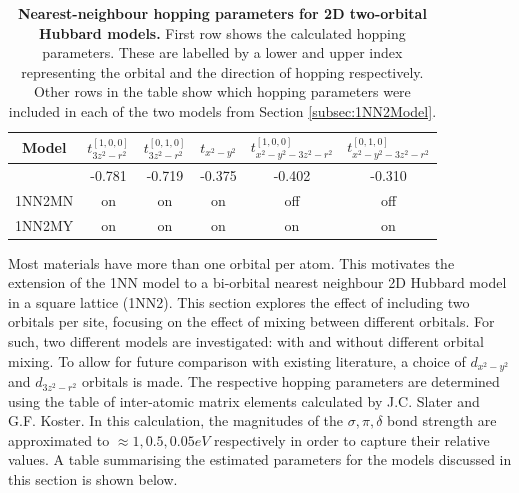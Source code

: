 \documentclass[12pt]{article}
\begin{document}
\begin{table}[h]
    \centering
    \begin{tabular}{|c|c|c|c|c|c|}
        \hline
       Model &$t^{[1,0,0]}_{3z^2-r^2}$  &$t^{[0,1,0]}_{3z^2-r^2}$  &  $t_{x^2 - y^2}$ &  $t^{[1,0,0]}_{x^2 - y^2 -3z^2-r^2} $ & $t^{[0,1,0]}_{x^2 - y^2 -3z^2-r^2} $ \\
        \hline
        & -0.781 & -0.719  &  -0.375 & -0.402 & -0.310\\
        \hline
        1NN2MN & on &  on  & on  & off & off  \\
        \hline
        1NN2MY & on &  on  & on  & on & on \\
          
        \hline
    \end{tabular}
    \caption{\textbf{Nearest-neighbour hopping parameters for 2D  two-orbital Hubbard models.} First row shows the calculated hopping parameters.
    These are labelled by a lower and upper index representing the orbital and the direction of hopping respectively.
    Other rows in the table show which hopping parameters were included in each of the two models from Section \ref{subsec:1NN2Model}.}
    \label{tab:2D2orbparams }
\end{table}


\noindent Most materials have more than one orbital per atom. This motivates the extension of the 
1NN model to a  bi-orbital nearest neighbour 2D Hubbard model in a square lattice (1NN2). This section explores the effect
of including two orbitals per site, focusing on the effect of mixing between different orbitals. For such, two different models are 
investigated: with and without different orbital mixing. To allow for future comparison with
existing literature\cite{sakakibara2024possible}, a choice of $d_{x^2-y^2}$ and $d_{3z^2 -r^2}$ orbitals is made. 
The respective hopping parameters are determined using the  table of inter-atomic matrix elements calculated by J.C. Slater and G.F. Koster\cite{slater1954simplified}. 
In this calculation, the magnitudes of the $\sigma,  \pi, \delta$ bond strength  are approximated to  $\approx  1, 0.5, 0.05eV$ respectively in order to capture their relative values\cite{blanksby2003bond, mcgrady2015introduction, krapp2008strength}.
A table summarising the estimated parameters for the models discussed in this section is shown below.\par

\medskip
\end{document}
